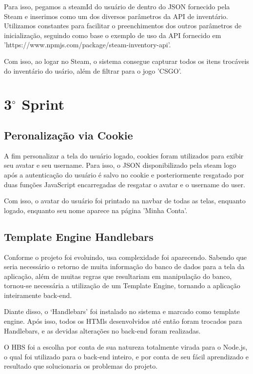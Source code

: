     Para isso, pegamos a steamId do usuário de dentro do JSON fornecido pela Steam e inserimos como um dos diversos parâmetros da API de 
    inventário. Utilizamos constantes para facilitar o preenchimentos dos outros parâmetros de inicialização, seguindo como base o 
    exemplo de uso da API fornecido em 'https://www.npmjs.com/package/steam-inventory-api'.

    Com isso, ao logar no Steam, o sistema consegue capturar todos os itens trocáveis do inventário do usário, 
    além de filtrar para o jogo 'CSGO'.


    \section{3$^{\circ}$ Sprint}
    \subsection{Peronalização via Cookie}
    A fim personalizar a tela do usuário logado, cookies foram utilizados para 
    exibir seu avatar e seu username. Para isso, o JSON disponibilizado pela steam logo 
    após a autenticação do usuário é salvo no cookie e posteriormente resgatado por duas 
    funções JavaScript encarregadas de resgatar o avatar e o username do user.

    Com isso, o avatar do usuário foi printado na navbar de todas as telas, enquanto logado, enquanto seu nome 
    aparece na página 'Minha Conta'.

    \subsection{Template Engine Handlebars}
    Conforme o projeto foi evoluindo, usa complexidade foi aparecendo. Sabendo que seria necessário o retorno 
    de muita informação do banco de dados para a tela da aplicação, além de muitas regras que resultariam 
    em manipulação do banco, tornou-se necessária a utilização de um Template Engine, tornando a aplicação 
    inteiramente back-end. 
    
    Diante disso, o ‘Handlebars’ foi instalado no sistema e marcado como template engine. Após isso, todos 
    os HTMls desenvolvidos até então foram trocados para Handlebars, e as devidas alterações no back-end 
    foram realizadas.
    
    O HBS foi a escolha por conta de sua natureza totalmente virada para o Node.js, o qual foi utilizado 
    para o back-end inteiro, e por conta de seu fácil aprendizado e resultado que solucionaria os 
    problemas do projeto.

